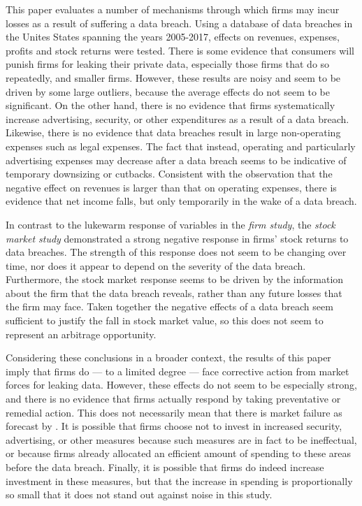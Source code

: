 \documentclass[../Main.tex]{subfiles}
\begin{document}
This paper evaluates a number of mechanisms through which firms may incur losses as a result of suffering a data breach. Using a database of data breaches in the Unites States spanning the years 2005-2017, effects on revenues, expenses, profits and stock returns were tested. There is some evidence that consumers will punish firms for leaking their private data, especially those firms that do so repeatedly, and smaller firms. However, these results are noisy and seem to be driven by some large outliers, because the average effects do not seem to be significant. On the other hand, there is no evidence that firms systematically increase advertising, security, or other expenditures as a result of a data breach. Likewise, there is no evidence that data breaches result in large non-operating expenses such as legal expenses. The fact that instead, operating and particularly advertising expenses may decrease after a data breach seems to be indicative of temporary downsizing or cutbacks. Consistent with the observation that the negative effect on revenues is larger than that on operating expenses, there is evidence that net income falls, but only temporarily in the wake of a data breach. 

In contrast to the lukewarm response of variables in the \textit{firm study}, the \textit{stock market study} demonstrated a strong negative response in firms' stock returns to data breaches. The strength of this response does not seem to be changing over time, nor does it appear to depend on the severity of the data breach. Furthermore, the stock market response seems to be driven by the information about the firm that the data breach reveals, rather than any future losses that the firm may face. Taken together the negative effects of a data breach seem sufficient to justify the fall in stock market value, so this does not seem to represent an arbitrage opportunity.

Considering these conclusions in a broader context, the results of this paper imply that firms do --- to a limited degree --- face corrective action from market forces for leaking data. However, these effects do not seem to be especially strong, and there is no evidence that firms actually respond by taking preventative or remedial action. This does not necessarily mean that there is market failure as forecast by \cite{roberds2009}. It is possible that firms choose not to invest in increased security, advertising, or other measures because such measures are in fact to be ineffectual, or because firms already allocated an efficient amount of spending to these areas before the data breach. Finally, it is possible that firms do indeed increase investment in these measures, but that the increase in spending is proportionally so small that it does not stand out against noise in this study. 
\end{document}

